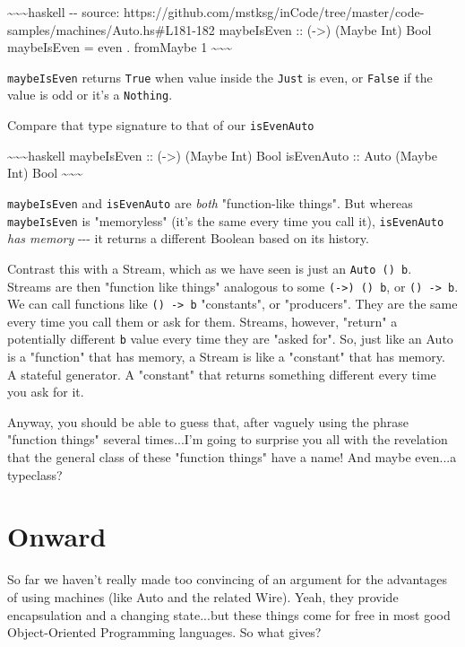 \documentclass[]{article}
\begin{document}
\textasciitilde{}\textasciitilde{}\textasciitilde{}haskell -\/- source:
https://github.com/mstksg/inCode/tree/master/code-samples/machines/Auto.hs\#L181-182
maybeIsEven :: (-\textgreater{}) (Maybe Int) Bool maybeIsEven = even . fromMaybe
1 \textasciitilde{}\textasciitilde{}\textasciitilde{}

\texttt{maybeIsEven} returns \texttt{True} when value inside the \texttt{Just}
is even, or \texttt{False} if the value is odd or it's a \texttt{Nothing}.

Compare that type signature to that of our \texttt{isEvenAuto}

\textasciitilde{}\textasciitilde{}\textasciitilde{}haskell maybeIsEven ::
(-\textgreater{}) (Maybe Int) Bool isEvenAuto :: Auto (Maybe Int) Bool
\textasciitilde{}\textasciitilde{}\textasciitilde{}

\texttt{maybeIsEven} and \texttt{isEvenAuto} are \emph{both} "function-like
things". But whereas \texttt{maybeIsEven} is "memoryless" (it's the same every
time you call it), \texttt{isEvenAuto} \emph{has memory} -\/-\/- it returns a
different Boolean based on its history.

Contrast this with a Stream, which as we have seen is just an
\texttt{Auto\ ()\ b}. Streams are then "function like things" analogous to some
\texttt{(-\textgreater{})\ ()\ b}, or \texttt{()\ -\textgreater{}\ b}. We can
call functions like \texttt{()\ -\textgreater{}\ b} "constants", or "producers".
They are the same every time you call them or ask for them. Streams, however,
"return" a potentially different \texttt{b} value every time they are "asked
for". So, just like an Auto is a "function" that has memory, a Stream is like a
"constant" that has memory. A stateful generator. A "constant" that returns
something different every time you ask for it.

Anyway, you should be able to guess that, after vaguely using the phrase
"function things" several times...I'm going to surprise you all with the
revelation that the general class of these "function things" have a name! And
maybe even...a typeclass?

\section{Onward}

So far we haven't really made too convincing of an argument for the advantages
of using machines (like Auto and the related Wire). Yeah, they provide
encapsulation and a changing state...but these things come for free in most good
Object-Oriented Programming languages. So what gives?
\end{document}
